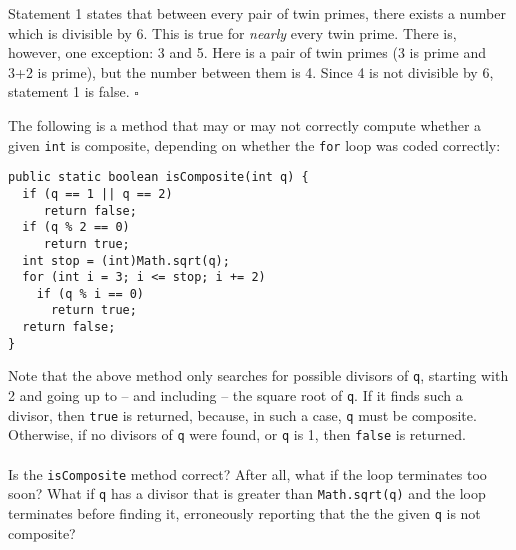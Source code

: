 \documentclass[12pt]{exam}
\begin{document}
\begin{questions}
\begin{parts}
{\begin{minipage}[t]{14.55cm}
			Statement 1 states that between every pair of twin primes, there exists a number which is divisible by 6. This is true for \textit{nearly} every twin prime. There is, however, one exception: 3 and 5. Here is a pair of twin primes (3 is prime and 3+2 is prime), but the number between them is 4. Since 4 is not divisible by 6, statement 1 is false. $\square$
			
			\vspace{25pt}
			\end{minipage}
		}
	\end{parts}
	
	
	
\clearpage
	

    \question[6] The following is a method that may or may not correctly compute whether a given {\tt int} is composite, depending on whether the {\tt for} loop was coded correctly:
\begin{verbatim}
public static boolean isComposite(int q) {
  if (q == 1 || q == 2) 
     return false;
  if (q % 2 == 0) 
     return true;
  int stop = (int)Math.sqrt(q);
  for (int i = 3; i <= stop; i += 2)
    if (q % i == 0)
      return true;
  return false;
}\end{verbatim}
Note that the above method only searches for possible divisors of \texttt{q}, starting with 2 and going up to -- and including -- the square root of {\tt q}. If it finds such a divisor, then \texttt{true} is returned, because, in such a case, \texttt{q} must be composite. Otherwise, if no divisors of \texttt{q} were found, or \texttt{q} is 1, then \texttt{false} is returned. \\
\\
Is the {\tt isComposite} method correct? After all, what if the loop terminates too soon? What if \texttt{q} has a divisor that is greater than \texttt{Math.sqrt(q)} and the loop terminates before finding it, erroneously reporting that the the given {\tt q} is not composite? 

\end{questions}
\end{document}
